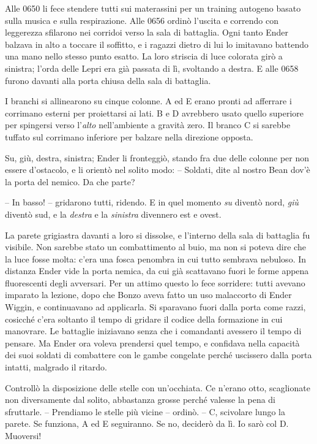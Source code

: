 {Alle 0650 li fece stendere tutti sui materassini per un training
	autogeno basato sulla musica e sulla respirazione. Alle 0656 ordinò
	l'uscita e correndo con leggerezza sfilarono nei corridoi verso la sala
	di battaglia. Ogni tanto Ender balzava in alto a toccare il soffitto, e
	i ragazzi dietro di lui lo imitavano battendo una mano nello stesso
	punto esatto. La loro striscia di luce colorata girò a sinistra; l'orda
	delle Lepri era già passata di lì, svoltando a destra. E alle 0658
	furono davanti alla porta chiusa della sala di battaglia.}

{I branchi si allinearono su cinque colonne. A ed E erano pronti ad
	afferrare i corrimano esterni per proiettarsi ai lati. B e D avrebbero
	usato quello superiore per spingersi verso l'\emph{alto} nell'ambiente a
	gravità zero. Il branco C si sarebbe tuffato sul corrimano inferiore per
	balzare nella direzione opposta.}

{Su, giù, destra, sinistra; Ender li fronteggiò, stando fra due delle
	colonne per non essere d'ostacolo, e li orientò nel solito modo: --
	Soldati, dite al nostro Bean dov'è la porta del nemico. Da che parte?}

{-- In basso! -- gridarono tutti, ridendo. E in quel momento \emph{su}
	diventò nord, \emph{giù} diventò sud, e la \emph{destra} e la
	\emph{sinistra} divennero est e ovest.}

{La parete grigiastra davanti a loro si dissolse, e l'interno della sala
	di battaglia fu visibile. Non sarebbe stato un combattimento al buio, ma
	non si poteva dire che la luce fosse molta: c'era una fosca penombra in
	cui tutto sembrava nebuloso. In distanza Ender vide la porta nemica, da
	cui già scattavano fuori le forme appena fluorescenti degli avversari.
	Per un attimo questo lo fece sorridere: tutti avevano imparato la
	lezione, dopo che Bonzo aveva fatto un uso malaccorto di Ender Wiggin, e
	continuavano ad applicarla. Si sparavano fuori dalla porta come razzi,
	cosicché c'era soltanto il tempo di gridare il codice della formazione
	in cui manovrare. Le battaglie iniziavano senza che i comandanti
	avessero il tempo di pensare. Ma Ender ora voleva prendersi quel tempo,
	e confidava nella capacità dei suoi soldati di combattere con le gambe
	congelate perché uscissero dalla porta intatti, malgrado il ritardo.}

{Controllò la disposizione delle stelle con un'occhiata. Ce n'erano
	otto, scaglionate non diversamente dal solito, abbastanza grosse perché
	valesse la pena di sfruttarle. -- Prendiamo le stelle più vicine --
	ordinò. -- C, scivolare lungo la parete. Se funziona, A ed E seguiranno.
	Se no, deciderò da lì. Io sarò col D. Muoversi!}

